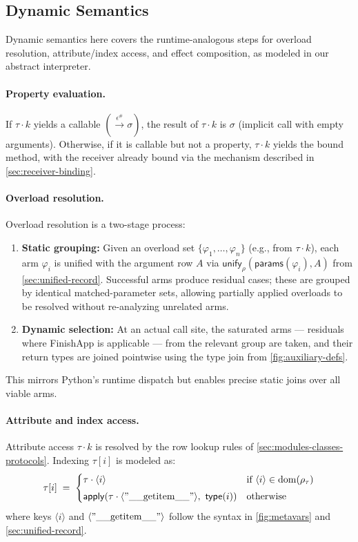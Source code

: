 \subsection{Dynamic Semantics}

Dynamic semantics here covers the runtime-analogous steps for overload resolution, attribute/index access, and effect composition, as modeled in our abstract interpreter.

\paragraph{Property evaluation.}
If $\tau \cdot k$ yields a callable $(\xrightarrow{\epsilon^\#} \sigma)$, 
the result of $\tau \cdot k$ is $\sigma$ (implicit call with empty arguments).  
Otherwise, if it is callable but not a property, $\tau \cdot k$ yields the bound method, with the receiver already bound via the mechanism described in \cref{sec:receiver-binding}.

\paragraph{Overload resolution.}
\label{sec:overload-resolution}
Overload resolution is a two-stage process:
\begin{enumerate}
\item \textbf{Static grouping:}  
  Given an overload set $\{\varphi_1, \ldots, \varphi_n\}$ (e.g., from $\tau \cdot k$), each arm $\varphi_i$ is unified with the argument row $A$ via  
  $\mathsf{unify}_{\rho}(\mathsf{params}(\varphi_i), A)$ from \cref{sec:unified-record}.  
  Successful arms produce residual cases; these are grouped by identical matched-parameter sets, allowing partially applied overloads to be resolved without re-analyzing unrelated arms.
\item \textbf{Dynamic selection:}  
  At an actual call site, the saturated arms --- residuals where \textsf{FinishApp} is applicable --- from the relevant group are taken, and their return types are joined pointwise using the type join from \cref{fig:auxiliary-defs}.
\end{enumerate}
This mirrors Python’s runtime dispatch but enables precise static joins over all viable arms.

\paragraph{Attribute and index access.}  
\label{sec:rows-generic-access}
Attribute access $\tau \cdot k$ is resolved by the row lookup rules of \cref{sec:modules-classes-protocols}.  
Indexing $\tau[i]$ is modeled as:
\[
\tau[i] \;=\;
\begin{cases}
\tau \cdot \langle i\rangle & \text{if $\langle i\rangle \in \mathrm{dom}(\rho_\tau)$} \\[0.3em]
\mathsf{apply}(\tau \cdot \langle \mathrm{"\_\_getitem\_\_"}\rangle,\ \mathsf{type}(i)) & \text{otherwise}
\end{cases}
\]
where keys $\langle i\rangle$ and $\langle \mathrm{"\_\_getitem\_\_"}\rangle$ follow the syntax in \cref{fig:metavars} and \cref{sec:unified-record}.

